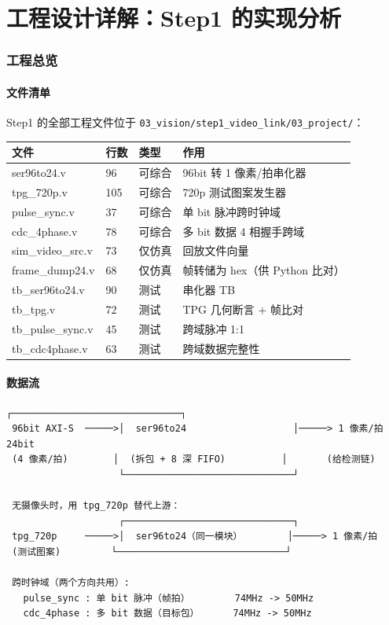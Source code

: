 \part{工程设计详解：Step1 的实现分析}

\section{工程总览}

\subsection{文件清单}

Step1 的全部工程文件位于 \texttt{03\_vision/step1\_video\_link/03\_project/}：

\begin{center}
\renewcommand{\arraystretch}{1.25}
\begin{tabular}{llll}
\toprule
\textbf{文件} & \textbf{行数} & \textbf{类型} & \textbf{作用} \\
\midrule
ser96to24.v & 96 & 可综合 & 96bit 转 1 像素/拍串化器 \\
tpg\_720p.v & 105 & 可综合 & 720p 测试图案发生器 \\
pulse\_sync.v & 37 & 可综合 & 单 bit 脉冲跨时钟域 \\
cdc\_4phase.v & 78 & 可综合 & 多 bit 数据 4 相握手跨域 \\
sim\_video\_src.v & 73 & 仅仿真 & 回放文件向量 \\
frame\_dump24.v & 68 & 仅仿真 & 帧转储为 hex（供 Python 比对）\\
tb\_ser96to24.v & 90 & 测试 & 串化器 TB \\
tb\_tpg.v & 72 & 测试 & TPG 几何断言 + 帧比对 \\
tb\_pulse\_sync.v & 45 & 测试 & 跨域脉冲 1:1 \\
tb\_cdc4phase.v & 63 & 测试 & 跨域数据完整性 \\
\bottomrule
\end{tabular}
\end{center}

\subsection{数据流}

\begin{Verbatim}[frame=single,fontsize=\small]
                    ┌──────────────────────────────┐
 96bit AXI-S  ─────>│  ser96to24                   │─────> 1 像素/拍 24bit
 (4 像素/拍)        │  (拆包 + 8 深 FIFO)          │       (给检测链)
                    └──────────────────────────────┘

 无摄像头时，用 tpg_720p 替代上游：
                    ┌──────────────────────────────┐
 tpg_720p     ─────>│  ser96to24（同一模块）        │─────> 1 像素/拍
 (测试图案)         └──────────────────────────────┘

 跨时钟域（两个方向共用）:
   pulse_sync : 单 bit 脉冲（帧拍）        74MHz -> 50MHz
   cdc_4phase : 多 bit 数据（目标包）      74MHz -> 50MHz
\end{Verbatim}

